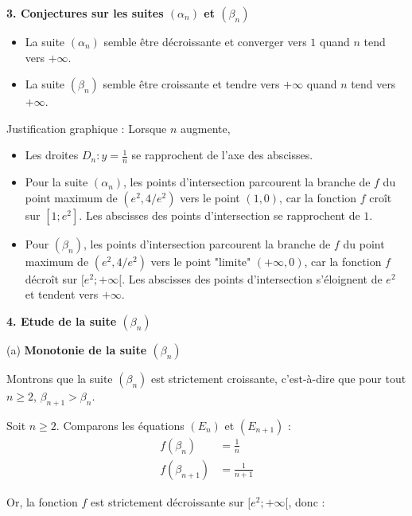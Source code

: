 \documentclass[10pt,a4paper]{article}
\begin{document}
\bigskip
\textbf{3. Conjectures sur les suites \( (\alpha_n) \) et \( (\beta_n) \) }

\begin{itemize}
\item La suite \( (\alpha_n) \) semble être décroissante et converger vers \( 1 \) quand \( n \)
tend vers \( +\infty \).
\item La suite \( (\beta_n) \) semble être croissante et tendre vers \( +\infty \) quand \( n \)
tend vers \( +\infty \).
\end{itemize}

\medskip
Justification graphique : Lorsque \( n \) augmente,
\begin{itemize}
\item Les droites \( D_n : y = \frac{1}{n} \) se rapprochent de l'axe des abscisses.
\item Pour la suite \( (\alpha_n) \), les points d'intersection parcourent la branche de \( f \) du
point maximum de \( (e^2, 4/e^2) \) vers le point \( (1, 0) \), car la fonction \( f \) croît sur \(
[1; e^2] \). Les abscisses des points d'intersection se rapprochent de \( 1 \).
\item Pour \( (\beta_n) \), les points d'intersection parcourent la branche de \( f \) du point
maximum de \( (e^2, 4/e^2) \) vers le point "limite" \( (+\infty, 0) \), car la fonction \( f \)
décroît sur \( [e^2; +\infty[ \). Les abscisses des points d'intersection s'éloignent de \( e^2 \)
et tendent vers \( +\infty \).
\end{itemize}

\bigskip
\textbf{4. Etude de la suite \( (\beta_n) \)}

(a) \textbf{Monotonie de la suite \((\beta_n)\)}

Montrons que la suite \((\beta_n)\) est strictement croissante, c'est-à-dire que pour tout \(n \geq
2\), \(\beta_{n+1} > \beta_n\).

Soit \(n \geq 2\). Comparons les équations \((E_n)\) et \((E_{n+1})\) :
\begin{align}
f(\beta_n) &= \frac{1}{n} \\
f(\beta_{n+1}) & = \frac{1}{n+1}
\end{align}

Or, la fonction \( f \) est strictement décroissante sur \([e^2; +\infty[\), donc :
\end{document}
